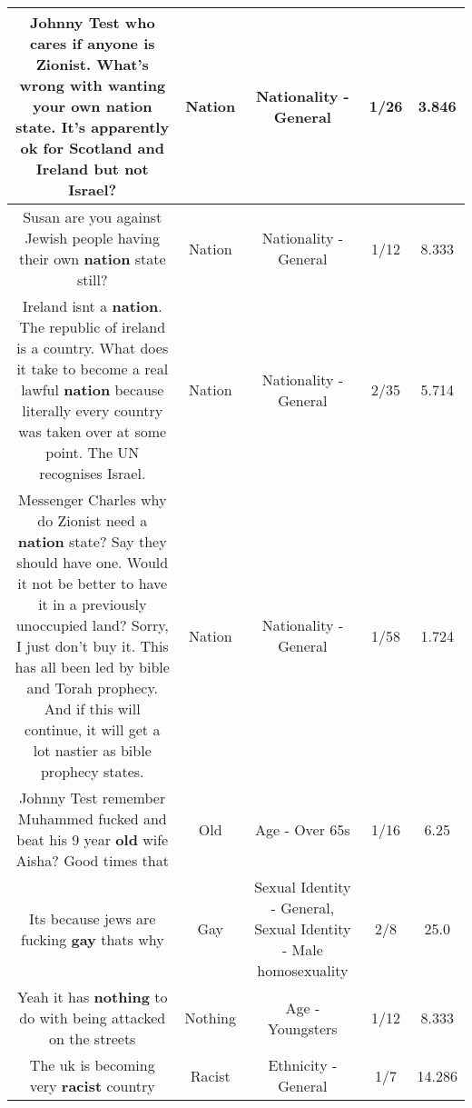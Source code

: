 \documentclass[11pt]{article}
\newlength\mylength
\begin{document}
\begin{center}
\begin{longtable}{|C{.65\mylength}|C{.30\mylength}|C{.12\mylength}|C{.12\mylength}|C{.12\mylength}|}
  \small Johnny Test who cares if anyone is Zionist. What's wrong with wanting your own \textbf{nation} state. It's apparently ok for Scotland and Ireland but not Israel?\normalsize   & Nation & Nationality - General & 1/26 & 3.846 \\  \hline
  \small Susan are you against Jewish people having their own \textbf{nation} state still?\normalsize   & Nation & Nationality - General & 1/12 & 8.333 \\  \hline
  \small Ireland isnt a \textbf{nation}. The republic of ireland is a country. What does it take to become a real lawful \textbf{nation} because literally every country was taken over at some point. The UN recognises Israel.\normalsize   & Nation & Nationality - General & 2/35 & 5.714 \\  \hline
  \small Messenger Charles why do Zionist need a \textbf{nation} state? Say they should have one. Would it not be better to have it in a previously unoccupied land? Sorry, I just don't buy it. This has all been led by bible and Torah prophecy. And if this will continue, it will get a lot nastier as bible prophecy states.\normalsize   & Nation & Nationality - General & 1/58 & 1.724 \\  \hline
  \small Johnny Test remember Muhammed fucked and beat his 9 year \textbf{old} wife Aisha? Good times that\normalsize   & Old & Age - Over 65s & 1/16 & 6.25 \\  \hline
  \small Its because jews are fucking \textbf{g\textbf{ay}} thats why\normalsize   & Gay & Sexual Identity - General, Sexual Identity - Male homosexuality & 2/8 & 25.0 \\  \hline
  \small Yeah it has \textbf{nothing} to do with being attacked on the streets\normalsize   & Nothing & Age - Youngsters & 1/12 & 8.333 \\  \hline
  \small The uk is becoming very \textbf{racist} country\normalsize   & Racist & Ethnicity - General & 1/7 & 14.286 \\  \hline

\end{longtable}
\end{center}
\end{document}

